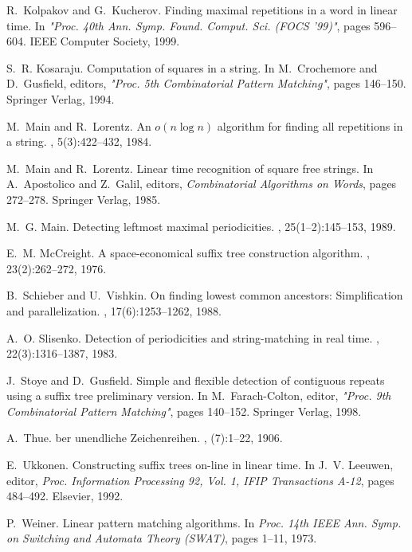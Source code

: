 \documentclass{article}
\begin{document}
\begin{thebibliography}{10}
R.~Kolpakov and G.~Kucherov.
\newblock Finding maximal repetitions in a word in linear time.
\newblock In {\em "Proc. 40th Ann. Symp. Found. Comput. Sci. (FOCS '99)"},
  pages 596--604. IEEE Computer Society, 1999.

S.~R. Kosaraju.
\newblock Computation of squares in a string.
\newblock In M.~Crochemore and D.~Gusfield, editors, {\em "Proc. 5th
  Combinatorial Pattern Matching"}, pages 146--150. Springer Verlag, 1994.

M.~Main and R.~Lorentz.
\newblock An $o(n\log n)$ algorithm for finding all repetitions in a string.
, 5(3):422--432, 1984.

M.~Main and R.~Lorentz.
\newblock Linear time recognition of square free strings.
\newblock In A.~Apostolico and Z.~Galil, editors, {\em Combinatorial Algorithms
  on Words}, pages 272--278. Springer Verlag, 1985.

M.~G. Main.
\newblock Detecting leftmost maximal periodicities.
, 25(1--2):145--153, 1989.

E.~M. {McCreight}.
\newblock A space-economical suffix tree construction algorithm.
, 23(2):262--272, 1976.

B.~Schieber and U.~Vishkin.
\newblock On finding lowest common ancestors: Simplification and
  parallelization.
, 17(6):1253--1262, 1988.

A.~O. Slisenko.
\newblock Detection of periodicities and string-matching in real time.
, 22(3):1316--1387, 1983.

J.~Stoye and D.~Gusfield.
\newblock Simple and flexible detection of contiguous repeats using a suffix
  tree preliminary version.
\newblock In M.~Farach-Colton, editor, {\em "Proc. 9th Combinatorial Pattern
  Matching"}, pages 140--152. Springer Verlag, 1998.

A.~Thue.
ber unendliche {Zeichenreihen}.
, (7):1--22, 1906.

E.~Ukkonen.
\newblock Constructing suffix trees on-line in linear time.
\newblock In J.~V. Leeuwen, editor, {\em Proc. Information Processing 92, Vol.
  1, IFIP Transactions A-12}, pages 484--492. Elsevier, 1992.

P.~Weiner.
\newblock Linear pattern matching algorithms.
\newblock In {\em Proc. 14th IEEE Ann. Symp. on Switching and Automata Theory
  (SWAT)}, pages 1--11, 1973.

\end{thebibliography}
\end{document}
